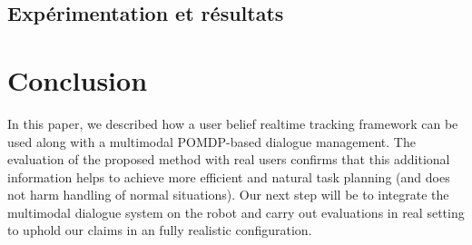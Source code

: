 \documentclass[a4paper,11pt,twoside]{StyleThese}
\begin{document}
\subsection{Expérimentation et résultats}







\section{Conclusion}
\label{sec:conclusion}
In this paper, we described how a user belief realtime tracking framework can be used along with a multimodal POMDP-based dialogue management. The evaluation of the proposed method with real users confirms that this additional information helps to achieve more efficient and natural task planning (and does not harm handling of normal situations). 
Our next step will be to integrate the multimodal dialogue system on the robot and carry out evaluations in real setting to uphold our claims in an fully realistic configuration.








\ifdefined{}
\else


\end{document}
